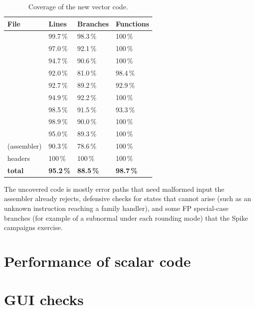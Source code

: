 \documentclass[11pt]{article}
\begin{document}
\begin{table}[H]
\centering\small
\caption{Coverage of the new vector code.}\label{tab:coverage}
\begin{tabularx}{\textwidth}{@{}YL{2.1cm}L{2.3cm}L{2.0cm}@{}}
\toprule
File & Lines & Branches & Functions \\
\midrule
{} & 99.7\,\% & 98.3\,\% & 100\,\% \\
 & 97.0\,\% & 92.1\,\% & 100\,\% \\
 & 94.7\,\% & 90.6\,\% & 100\,\% \\
 & 92.0\,\% & 81.0\,\% & 98.4\,\% \\
 & 92.7\,\% & 89.2\,\% & 92.9\,\% \\
 & 94.9\,\% & 92.2\,\% & 100\,\% \\
 & 98.5\,\% & 91.5\,\% & 93.3\,\% \\
 & 98.9\,\% & 90.0\,\% & 100\,\% \\
 & 95.0\,\% & 89.3\,\% & 100\,\% \\
 (assembler) & 90.3\,\% & 78.6\,\% & 100\,\% \\
headers & 100\,\% & 100\,\% & 100\,\% \\
\midrule
\textbf{total} & \textbf{95.2\,\%} & \textbf{88.5\,\%} & \textbf{98.7\,\%} \\
\bottomrule
\end{tabularx}
\end{table}

The uncovered code is mostly error paths that need malformed input the assembler already
rejects, defensive checks for states that cannot arise (such as an unknown instruction reaching
a family handler), and some FP special-case branches (for example  of a subnormal
under each rounding mode) that the Spike campaigns exercise.

\section{Performance of scalar code}\label{sec:perf}



\section{GUI checks}\label{sec:gui}
\end{document}
